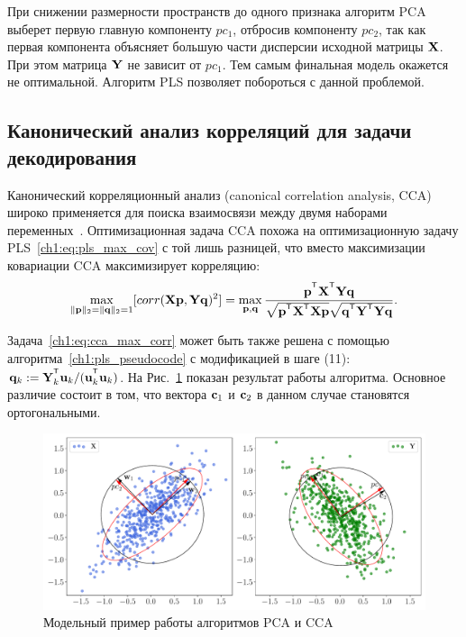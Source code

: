 При снижении размерности пространств до одного признака алгоритм PCA выберет первую главную компоненту $pc_1$, отбросив компоненту $pc_2$, так как первая компонента объясняет большую части дисперсии исходной матрицы $\mathbf{X}$. 
При этом матрица $\mathbf{Y}$ не зависит от $pc_1$. 
Тем самым финальная модель окажется не оптимальной.
Алгоритм PLS позволяет побороться с данной проблемой.

\subsection{Канонический анализ корреляций для задачи декодирования}

Канонический корреляционный анализ (canonical correlation analysis, CCA) широко применяется для поиска взаимосвязи между двумя наборами переменных~\cite{hotelling1992relations,anderson1962introduction}. 
Оптимизационная задача CCA похожа на оптимизационную задачу PLS~\eqref{ch1:eq:pls_max_cov} с той лишь разницей, что вместо максимизации ковариации CCA максимизирует корреляцию:
\begin{equation}
	\max_{\|\bp\|_{2}=\|\bq\|_{2}=1}[ corr(\bX \bp, \bY \bq)^{2}] = \max_{\bp, \bq} \frac{\bp^{\T} \bX^{\T} \bY \bq}{\sqrt{\bp^{\T} \bX^{\T}  \bX \bp} \sqrt{\bq^{\T} \bY^{\T}  \bY\bq}}.
	\label{ch1:eq:cca_max_corr}
\end{equation}

Задача~\eqref{ch1:eq:cca_max_corr} может быть также решена с помощью алгоритма~\ref{ch1:pls_pseudocode} с модификацией в шаге (11): $\bq_k := \bY_k^{\T}\bu_k/(\bu_k^{\T}\bu_k)$.
На Рис.~\ref{ch1:fig:cca_toy_example} показан результат работы алгоритма. Основное различие состоит в том, что вектора $\mathbf{c}_1$ и $\mathbf{c}_2$ в данном случае становятся ортогональными.

\begin{figure}[h]
	\centering
	\includegraphics[width=\linewidth]{figs/ch1/cca_toy_example}
	\caption{Модельный пример работы алгоритмов PCA и CCA}
	\label{ch1:fig:cca_toy_example}
\end{figure}

